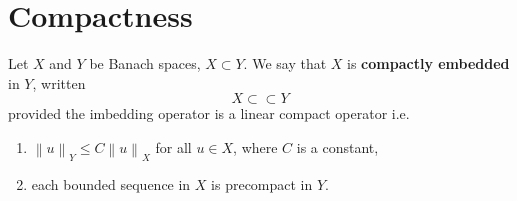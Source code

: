 \section{Compactness} %

\begin{definition}
    Let \( X \) and \( Y \) be Banach spaces, \( X \subset Y \). We say that \( X \) is \textbf{compactly embedded} in \( Y \), written
    \[
        X \subset \subset Y
    \]
    provided the imbedding operator is a linear compact operator i.e.
    \begin{enumerate}
        \item[(i)] \(\left\|u\right\|_Y \leq C \left\|u\right\|_X\) for all \( u \in X \), where \( C \) is a constant,
        \item[(ii)] each bounded sequence in \( X \) is precompact in \( Y \).
    \end{enumerate}
\end{definition}

